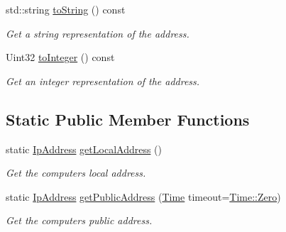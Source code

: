 \begin{DoxyCompactItemize}
std\+::string \hyperlink{classsf_1_1_ip_address_a88507954142d7fc2176cce7f36422340}{to\+String} () const
\begin{DoxyCompactList}\small\item\em Get a string representation of the address. \end{DoxyCompactList}\item 
Uint32 \hyperlink{classsf_1_1_ip_address_ae7911c5ea9562f9602c3e29cd54b15e9}{to\+Integer} () const
\begin{DoxyCompactList}\small\item\em Get an integer representation of the address. \end{DoxyCompactList}\end{DoxyCompactItemize}
\subsection*{Static Public Member Functions}
\begin{DoxyCompactItemize}
\item 
static \hyperlink{classsf_1_1_ip_address}{Ip\+Address} \hyperlink{classsf_1_1_ip_address_a4c31622ad87edca48adbb8e8ed00ee4a}{get\+Local\+Address} ()
\begin{DoxyCompactList}\small\item\em Get the computer\textquotesingle{}s local address. \end{DoxyCompactList}\item 
static \hyperlink{classsf_1_1_ip_address}{Ip\+Address} \hyperlink{classsf_1_1_ip_address_a5c5cbf67e4aacf23c24f2ad991df4c55}{get\+Public\+Address} (\hyperlink{classsf_1_1_time}{Time} timeout=\hyperlink{classsf_1_1_time_a8db127b632fa8da21550e7282af11fa0}{Time\+::\+Zero})
\begin{DoxyCompactList}\small\item\em Get the computer\textquotesingle{}s public address. \end{DoxyCompactList}\end{DoxyCompactItemize}
